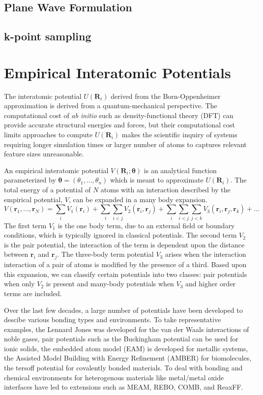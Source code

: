 \subsection{Plane Wave Formulation}
\subsection{k-point sampling}
\section{Empirical Interatomic Potentials}
The interatomic potential $U(\bm{R}_i)$ derived from the Born-Oppenheimer approximation is derived from a quantum-mechanical perspective.  The computational cost of \emph{ab initio} such as density-functional theory (DFT) can provide accurate structural energies and forces, but their computational cost limits approaches to compute $U(\bm{R}_i)$ makes the scientific inquiry of systems requiring longer simulation times or larger number of atoms to captures relevant feature sizes unreasonable.

An empirical interatomic potential $V(\bm{R}_i;\bm{\theta})$ is an analytical function parameterized by $\bm{\theta}=(\theta_1,...,\theta_n)$ which is meant to approximate $U(\bm{R}_i)$.  The total energy of a potential of $N$ atoms with an interaction described by the empirical potential, $V$, can be expanded in a many body expansion.
\begin{equation}
	V(\bm{r}_1,...,\bm{r}_N)= \sum_i V_1(\bm{r}_i)
	                          + \sum_i \sum_{i<j} V_2(\bm{r}_i,\bm{r}_j)
				  + \sum_i \sum_{i<j} \sum_{j<k} V_3(\bm{r}_i,\bm{r}_j,\bm{r}_k) + ...
\end{equation}
The first term $V_1$ is the one body term, due to an external field or boundary conditions, which is typically ignored in classical potentials.  The second term $V_2$ is the pair potential, the interaction of the term is dependent upon the distance between $\bm{r}_i$ and $\bm{r}_j$.  The three-body term potential $V_3$ arises when the interaction interaction of a pair of atoms is modified by the presence of a third.  Based upon this expansion, we can classify certain potentials into two classes: pair potentials when only $V_2$ is present and many-body potentials when $V_3$ and higher order terms are included.

Over the last few decades, a large number of potentials have been developed to descibe various bonding types and environments.  To take representative examples, the Lennard Jones was developed for the van der Waals interactions of noble gases, pair potentials such as the Buckingham potential can be used for ionic solids, the embedded atom model (EAM) is developed for metallic systems, the Assisted Model Building with Energy Refinement (AMBER) for biomolecules, the tersoff potential for covalently bonded materials.  To deal with bonding and chemical environments for heterogenous materials like metal/metal oxide interfaces have led to extensions such as MEAM, REBO, COMB, and ReaxFF.

